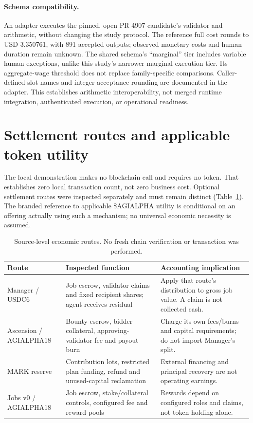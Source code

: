 \paragraph{Schema compatibility.}
An adapter executes the pinned, open PR 4907 candidate's
 validator and arithmetic, without changing the
study protocol. The reference full cost rounds to USD 3.350761, with 891
accepted outputs; observed monetary costs and human duration remain unknown.
The shared schema's ``marginal'' tier includes variable human exceptions,
unlike this study's narrower marginal-execution tier. Its aggregate-wage
threshold does not replace family-specific comparisons. Caller-defined slot
names and integer acceptance rounding are documented in the adapter. This
establishes arithmetic interoperability, not merged runtime integration,
authenticated execution, or operational readiness.


\section{Settlement routes and applicable token utility}

The local demonstration makes no blockchain call and requires no token. That establishes zero local transaction count, not zero business cost. Optional settlement routes were inspected separately and must remain distinct (Table~\ref{tab:tokens}). The branded reference to applicable \$AGIALPHA utility is conditional on an offering actually using such a mechanism; no universal economic necessity is assumed.

\begin{table}[htbp]\centering\small
\caption{Source-level economic routes. No fresh chain verification or transaction was performed.}\label{tab:tokens}
\begin{tabularx}{\linewidth}{@{}lXX@{}}\toprule
Route & Inspected function & Accounting implication\\\midrule
Manager / USDC6 & Job escrow, validator claims and fixed recipient shares; agent receives residual & Apply that route's distribution to gross job value. A claim is not collected cash.\\
Ascension / AGIALPHA18 & Bounty escrow, bidder collateral, approving-validator fee and payout burn & Charge its own fees/burns and capital requirements; do not import Manager's split.\\
MARK reserve & Contribution lots, restricted plan funding, refund and unused-capital reclamation & External financing and principal recovery are not operating earnings.\\
Jobs v0 / AGIALPHA18 & Job escrow, stake/collateral controls, configured fee and reward pools & Rewards depend on configured roles and claims, not token holding alone.\\\bottomrule
\end{tabularx}
\end{table}

